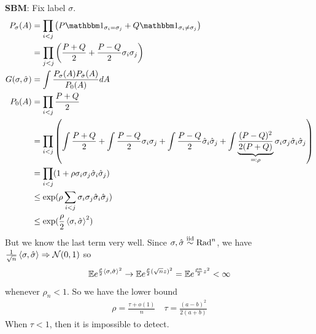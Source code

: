 \textbf{SBM}: Fix label $\sigma$.
\begin{align}
  P_\sigma(A) &= \prod_{i<j} \left( P \ind_{\sigma_i = \sigma_j} + Q \ind_{\sigma_i \neq \sigma_j} \right) \\
    &= \prod_{j < j}\left( \frac{P + Q}{2}  + \frac{P - Q}{2} \sigma_i \sigma_j \right) \\
  G(\sigma, \hat\sigma) &= \int \frac{P_\sigma(A) P_{\hat\sigma}(A)}{P_0(A)} dA \\
  P_0(A) &= \prod_{i < j} \frac{P+Q}{2} \\
  &= \prod_{i<j} \left( \int \frac{P+Q}{2}  + \int \frac{P-Q}{2} \sigma_i \sigma_j
  + \int \frac{P - Q}{2} \hat\sigma_i \hat\sigma_j + \int \underbrace{\frac{(P-Q)^2}{2(P+Q)}}_{\eqqcolon \rho} \sigma_i \sigma_j \hat\sigma_i \hat\sigma_j \right) \\
  &= \prod_{i < j} (1 + \rho \sigma_i \sigma_j \hat\sigma_i \hat\sigma_j) \\
  &\leq \exp(\rho \sum_{i < j} \sigma_i \sigma_j \hat\sigma_i \hat\sigma_j) \\
  &\leq \exp(\frac{\rho}{2} \braket{\sigma, \hat\sigma}^2)
\end{align}
But we know the last term very well. Since $\sigma, \hat\sigma \overset{\text{iid}}{\sim} \text{Rad}^n$, we have
$\frac{1}{\sqrt{n}} \braket{\sigma, \hat\sigma} \Rightarrow \mathcal{N}(0,1)$ so
\begin{align}
  \mathbb{E} e^{\frac{\rho}{2} \braket{\sigma, \hat\sigma}^2} 
  \to \mathbb{E} e^{\frac{\rho}{2} (\sqrt{n} z)^2} = \mathbb{E} e^{\frac{\rho n}{2} z^2} < \infty
\end{align}
whenever $\rho_n < 1$. So we have the lower bound
\begin{align}
  \rho = \frac{\tau + o(1)}{n} \quad \tau = \frac{(a  - b)^2}{2 (a + b)}
\end{align}
When $\tau < 1$, then it is impossible to detect.

